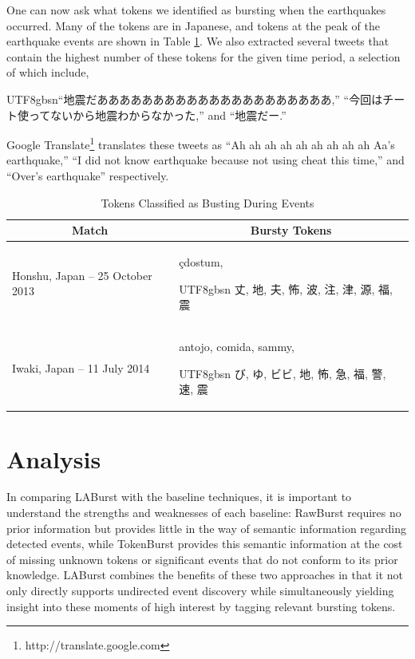 \documentclass[letterpaper]{article}
\newcommand{\myfont}{gbsn}
\begin{document}
One can now ask what tokens we identified as bursting when the earthquakes occurred.
Many of the tokens are in Japanese, and tokens at the peak of the earthquake events are shown in Table \ref{tab:japanTokens}.
We also extracted several tweets that contain the highest number of these tokens for the given time period, a selection of which include, \begin{CJK}{UTF8}{\myfont}``地震だあああああああああああああああああああああ,'' ``今回はチート使ってないから地震わからなかった,'' and ``地震だー.'' \end{CJK}
Google Translate\footnote{http://translate.google.com} translates these tweets as ``Ah ah ah ah ah ah ah ah ah Aa's earthquake,'' ``I did not know earthquake because not using cheat this time,'' and ``Over's earthquake'' respectively.
%
\begin{table}[htdp]
\caption{Tokens Classified as Busting During Events}
\begin{center}
\begin{tabular}{|p{1.45in} | p{1.45in} |}
\hline
\multicolumn{1}{|c|}{\textbf{Match}} & \multicolumn{1}{|c|}{\textbf{Bursty Tokens}} \\ \hline
Honshu, Japan -- 25 October 2013 & \c{c}dostum, \begin{CJK}{UTF8}{\myfont} 丈, 地, 夫, 怖, 波, 注, 津, 源, 福, 震 \end{CJK} \\ \hline
Iwaki, Japan -- 11 July 2014 & antojo, comida, sammy, \begin{CJK}{UTF8}{\myfont} び, ゆ, ビビ, 地, 怖, 急, 福, 警, 速, 震 \end{CJK} \\ \hline
\end{tabular}
\end{center}
\label{tab:japanTokens}
\end{table}

\section{Analysis}
\label{sect:analysis}

In comparing LABurst with the baseline techniques, it is important to understand the strengths and weaknesses of each baseline: RawBurst requires no prior information but provides little in the way of semantic information regarding detected events, while TokenBurst provides this semantic information at the cost of missing unknown tokens or significant events that do not conform to its prior knowledge.
LABurst combines the benefits of these two approaches in that it not only directly supports undirected event discovery while simultaneously yielding insight into these moments of high interest by tagging relevant bursting tokens.
\end{document}
